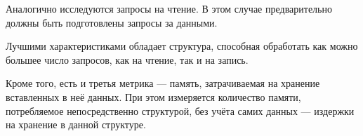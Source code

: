 Аналогично исследуются запросы на чтение.
В этом случае предварительно должны быть подготовлены
запросы за данными.

Лучшими характеристиками обладает структура,
способная обработать как можно большее число запросов, как на чтение,
так и на запись.

Кроме того, есть и третья метрика --- память,
затрачиваемая на хранение вставленных в неё данных.
При этом измеряется количество памяти,
потребляемое непосредственно структурой,
без учёта самих данных --- издержки на хранение в данной структуре.
